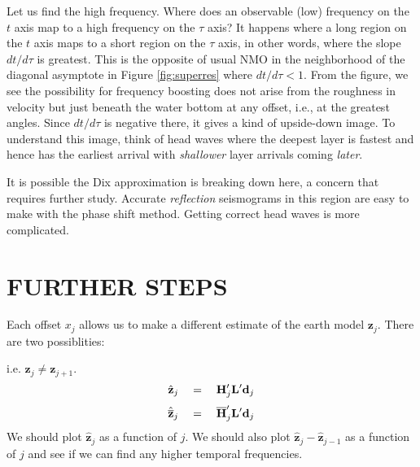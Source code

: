 \par
Let us find the high frequency.
Where does an observable (low) frequency on the $t$ axis
map to a high frequency on the $\tau$ axis?
It happens where a long region on the $t$ axis
maps to a short region on the $\tau$ axis,
in other words, where the slope $dt/d\tau$ is greatest.
This is the opposite of usual NMO
in the neighborhood of the diagonal asymptote
in Figure \ref{fig:superres}
where $dt/d\tau<1$.
From the figure,
we see the possibility for frequency boosting
does not arise from the roughness in velocity
but just beneath the water bottom at any offset,
i.e., at the greatest angles.
Since $dt/d\tau$ is negative there,
it gives a kind of upside-down image.
To understand this image, think of head waves where
the deepest layer is fastest and hence has the earliest arrival
with
{\it shallower}
layer arrivals coming
{\it later}.
\par
It is possible the Dix approximation is breaking down here,
a concern that requires further study.
Accurate
{\it reflection} seismograms in this region
are easy to make with the phase shift method.
Getting correct head waves is more complicated.

\section{FURTHER STEPS}
Each offset $x_j$ allows us to make a different estimate of
the earth model $\mathbf z_j$.
There are two possiblities:

i.e. $\mathbf z_j \ne \mathbf z_{j+1}$.
\begin{equation}
\hat {\mathbf z}_j \quad =\quad \mathbf H_j' \mathbf L' \mathbf d_j
\end{equation}
\begin{equation}
\hat {\overline{\mathbf z}}_j \quad =\quad \overline{\mathbf H}_j' \mathbf L' \mathbf d_j
\end{equation}
We should plot $\hat {\mathbf z}_j$ as a function of $j$.
We should also plot
$\hat {\mathbf z}_j - \hat {\mathbf z}_{j-1}$
as a function of $j$
and see if we can find any higher temporal frequencies.


